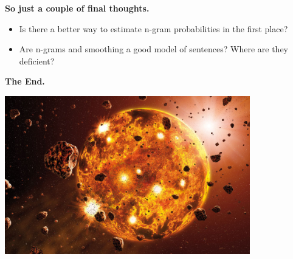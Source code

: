 \documentclass{beamer}
\newcommand{\pagestepalt}[2]{
  \begin{frame}[t]
    \begin{minipage}[t][0.26\textheight][t]{\textwidth}
      \begin{center}
        \huge
        \textbf{#1}
      \end{center}
    \end{minipage}
    
    \begin{minipage}[t][0.7\textheight][t]{\textwidth}
      #2
    \end{minipage}
  \end{frame}
}
\begin{document}
\pagestepalt{So just a couple of final thoughts.}{
  \begin{itemize}
  \item Is there a better way to estimate n-gram probabilities in the first place?\pause 
  \item Are n-grams and smoothing a good model of sentences? Where are they 
    deficient?
  \end{itemize}
}




\pagestepalt{The End.}{
  \begin{center}
    \includegraphics[width=0.8\textwidth]{images/formation.jpg}
  \end{center}
}
\end{document}
